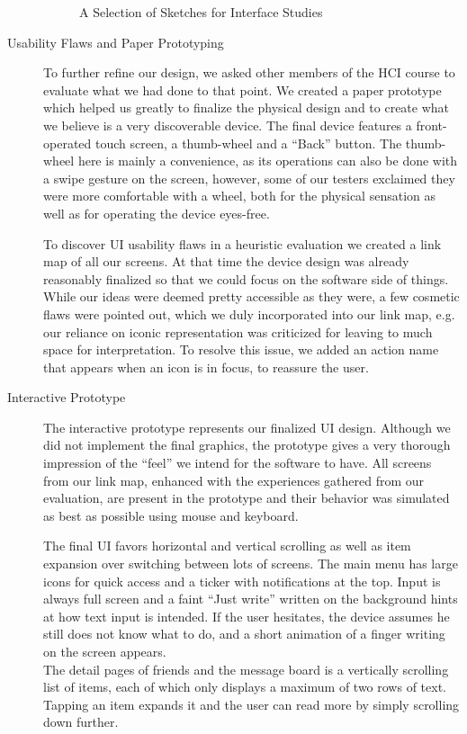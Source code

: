 \begin{description}
\begin{figure}[h]
\begin{center}
  \end{center}
  \caption{A Selection of Sketches for Interface Studies}
  \label{fig:sketches}
\end{figure}
  \item[Usability Flaws and Paper Prototyping]
    To further refine our design, we asked other members of the HCI course
    to evaluate what we had done to that point. We created a paper prototype
    which helped us greatly to finalize the physical design and to create 
    what we believe is a very
    discoverable device. The final device features a front-operated touch
    screen, a thumb-wheel and a ``Back'' button. The thumb-wheel here is 
    mainly a convenience, as its operations can also be done with a swipe
    gesture
    on the screen, however, some of our testers exclaimed they were more
    comfortable with a wheel, both for the physical sensation as well 
    as for operating the device eyes-free.

    To discover UI usability flaws in a heuristic evaluation we 
    created a link map
    of all our screens. At that time the device design was already 
    reasonably finalized so that we could focus on the software side of
    things. While our ideas were deemed pretty accessible as they were, 
    a few cosmetic flaws were pointed out, which we duly incorporated into
    our link map, e.g. our reliance on iconic representation was criticized
    for leaving to much space for interpretation. To resolve this issue, 
    we added an action name that appears when an icon is in focus, to 
    reassure the user.
  \item[Interactive Prototype]
    The interactive prototype represents our finalized UI design. Although
    we did not implement the final graphics, the prototype gives a very 
    thorough impression of the ``feel'' we intend for the software to have.
    All screens from our link map, enhanced with the experiences gathered 
    from our evaluation, are present in the prototype and their behavior 
    was simulated as best as possible using mouse and keyboard.

    The final UI favors horizontal and vertical scrolling as well as item
    expansion over switching between lots of screens. The main menu has 
    large icons for quick access and a ticker with notifications at the top.
    Input is always full screen and a faint ``Just write'' written on the
    background hints at how text input is intended. If the user hesitates,
    the device assumes he still does not know what to do, and a short 
    animation of a finger writing on the screen appears.\\ 
    The detail pages of friends and the message board is a vertically 
    scrolling list of items, each of which only displays a maximum of 
    two rows of text. Tapping an item expands it and the user can read 
    more by simply scrolling down further.


\end{description}
